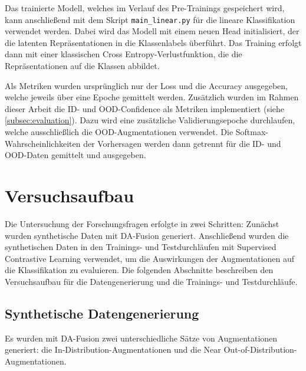 Das trainierte Modell, welches im Verlauf des Pre-Trainings gespeichert wird, kann anschließend mit dem Skript \lstinline{main_linear.py} für die lineare Klassifikation verwendet werden. Dabei wird das Modell mit einem neuen Head initialisiert, der die latenten Repräsentationen in die Klassenlabels überführt. Das Training erfolgt dann mit einer klassischen Cross Entropy-Verlustfunktion, die die Repräsentationen auf die Klassen abbildet.

Als Metriken wurden ursprünglich nur der Loss und die Accuracy ausgegeben, welche jeweils über eine Epoche gemittelt werden. Zusätzlich wurden im Rahmen dieser Arbeit die ID- und OOD-Confidence als Metriken implementiert (siehe \autoref{subsec:evaluation}). Dazu wird eine zusätzliche Validierungsepoche durchlaufen, welche ausschließlich die OOD-Augmentationen verwendet. Die Softmax-Wahrscheinlichkeiten der Vorhersagen werden dann getrennt für die ID- und OOD-Daten gemittelt und ausgegeben.

\section{Versuchsaufbau} \label{sec:experiment-setup}

Die Untersuchung der Forschungsfragen erfolgte in zwei Schritten: Zunächst wurden synthetische Daten mit DA-Fusion generiert. Anschließend wurden die synthetischen Daten in den Trainings- und Testdurchläufen mit Supervised Contrastive Learning verwendet, um die Auswirkungen der Augmentationen auf die Klassifikation zu evaluieren. Die folgenden Abschnitte beschreiben den Versuchsaufbau für die Datengenerierung und die Trainings- und Testdurchläufe.

\subsection{Synthetische Datengenerierung} \label{subsec:da-fusion-setup}

Es wurden mit DA-Fusion zwei unterschiedliche Sätze von Augmentationen generiert: die In-Distribution-Augmentationen und die Near Out-of-Distribution-Augmentationen.

